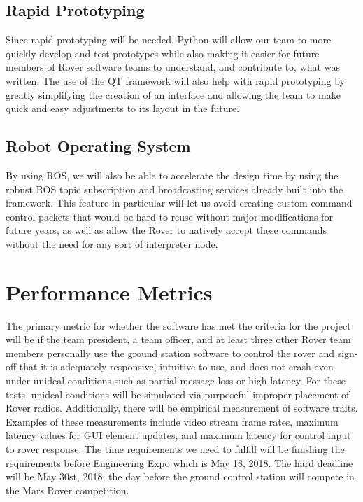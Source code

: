 \documentclass[onecolumn, draftclsnofoot, 10pt, compsoc]{IEEEtran}
\begin{document}
\subsection{Rapid Prototyping}
Since rapid prototyping will be needed, Python will allow our team to more quickly develop and test prototypes while also making it easier for future members of Rover software teams to understand, and contribute to, what was written. 
The use of the QT framework will also help with rapid prototyping by greatly simplifying the creation of an interface and allowing the team to make quick and easy adjustments to its layout in the future. 
\subsection{Robot Operating System}
By using ROS, we will also be able to accelerate the design time by using the robust ROS topic subscription and broadcasting services already built into the framework. 
This feature in particular will let us avoid creating custom command control packets that would be hard to reuse without major modifications for future years, as well as allow the Rover to natively accept these commands without the need for any sort of interpreter node.

\section{Performance Metrics}
The primary metric for whether the software has met the criteria for the project will be if the team president, a team officer, and at least three other Rover team members personally use the ground station software to control the rover and sign-off that it is adequately responsive, intuitive to use, and does not crash even under unideal conditions such as partial message loss or high latency. 
For these tests, unideal conditions will be simulated via purposeful improper placement of Rover radios.
Additionally, there will be empirical measurement of software traits. 
Examples of these measurements include video stream frame rates, maximum latency values for GUI element updates, and maximum latency for control input to rover response.
The time requirements we need to fulfill will be finishing the requirements before Engineering Expo which is May 18, 2018. The hard deadline will be May 30st, 2018, the day before the ground control station will compete in the Mars Rover competition. 
\end{document}
